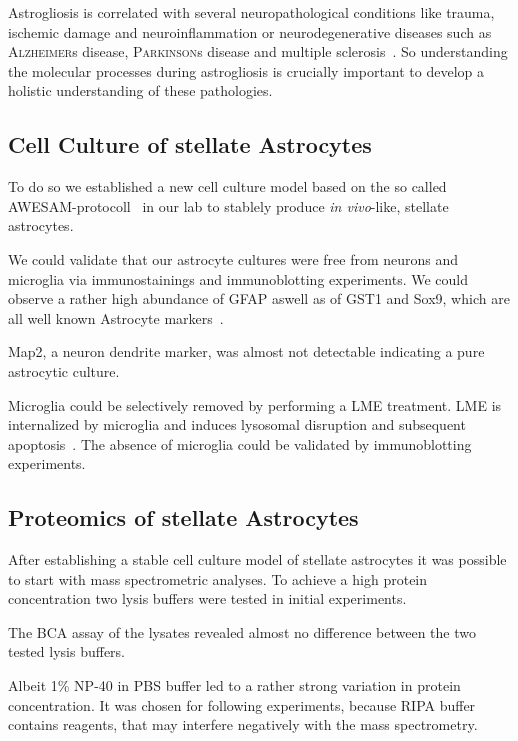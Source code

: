 \documentclass[a4paper,11pt,bibtotocnumbered]{article}
\begin{document}
Astrogliosis is correlated with several neuropathological conditions like trauma, ischemic damage and neuroinflammation or neurodegenerative diseases such as \textsc{Alzheimer}s disease, \textsc{Parkinson}s disease and multiple sclerosis~\cite{Pekny2014}. So understanding the molecular processes during astrogliosis is crucially important to develop a holistic understanding of these pathologies. 

\subsection{Cell Culture of stellate Astrocytes}

To do so we established a new cell culture model based on the so called AWESAM-protocoll~\cite{Wolfes2018} in our lab to stablely produce \textit{in vivo}-like, stellate astrocytes. 

We could validate that our astrocyte cultures were free from neurons and microglia via immunostainings and immunoblotting experiments. We could observe a rather high abundance of GFAP aswell as of GST1 and Sox9, which are all well known Astrocyte markers~\cite{Schiweck2018}.


Map2, a neuron dendrite marker, was almost not detectable indicating a pure astrocytic culture.

Microglia could be selectively removed by performing a LME treatment. LME is internalized by microglia and induces lysosomal disruption and subsequent apoptosis~\cite{Jebelli2015}. The absence of microglia could be validated by immunoblotting experiments.

\subsection{Proteomics of stellate Astrocytes}

After establishing a stable cell culture model of stellate astrocytes it was possible to start with mass spectrometric analyses. To achieve a high protein concentration two lysis buffers were tested in initial experiments. 

The BCA assay of the lysates revealed almost no difference between the two tested lysis buffers.

Albeit 1\% NP-40 in PBS buffer led to a rather strong variation in protein concentration. It was chosen for following experiments, because RIPA buffer contains reagents, that may interfere negatively with the mass spectrometry. 
\end{document}
